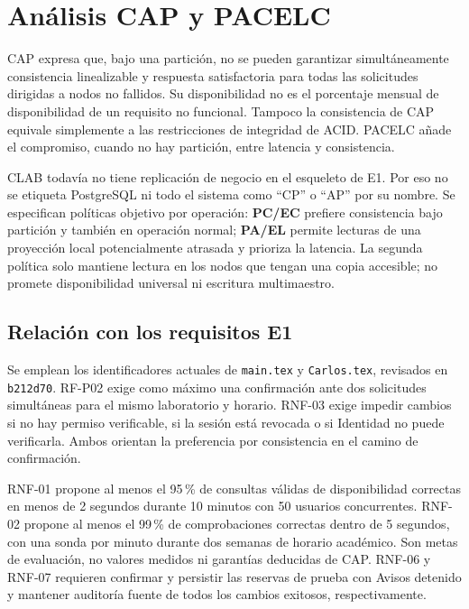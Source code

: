 \section{Análisis CAP y PACELC}
\label{sec:clab-cap}
\label{sec:clab-cap-pacelc}

CAP expresa que, bajo una partición, no se pueden garantizar simultáneamente
consistencia linealizable y respuesta satisfactoria para todas las solicitudes
dirigidas a nodos no fallidos\cite{clabGilbertLynchCAP}. Su disponibilidad no es
el porcentaje mensual de disponibilidad de un requisito no funcional. Tampoco
la consistencia de CAP equivale simplemente a las restricciones de integridad
de ACID. PACELC añade el compromiso, cuando no hay partición, entre latencia y
consistencia\cite{clabAbadiPACELC2012,clabAbadiPACELC}.

CLAB todavía no tiene replicación de negocio en el esqueleto de E1. Por eso no
se etiqueta PostgreSQL ni todo el sistema como ``CP'' o ``AP'' por su nombre.
Se especifican políticas objetivo por operación: \textbf{PC/EC} prefiere
consistencia bajo partición y también en operación normal; \textbf{PA/EL} permite
lecturas de una proyección local potencialmente atrasada y prioriza la latencia.
La segunda política solo mantiene lectura en los nodos que tengan una copia
accesible; no promete disponibilidad universal ni escritura multimaestro.

\subsection{Relación con los requisitos E1}

Se emplean los identificadores actuales de \texttt{main.tex} y
\texttt{Carlos.tex}, revisados en \texttt{b212d70}. RF-P02 exige como máximo
una confirmación ante dos solicitudes simultáneas para el mismo laboratorio
y horario. RNF-03 exige impedir cambios si no hay permiso verificable, si la
sesión está revocada o si Identidad no puede verificarla. Ambos orientan la
preferencia por consistencia en el camino de confirmación.

RNF-01 propone al menos el 95\,\% de consultas válidas de disponibilidad
correctas en menos de 2 segundos durante 10 minutos con 50 usuarios concurrentes.
RNF-02 propone al menos el 99\,\% de comprobaciones correctas dentro de 5 segundos,
con una sonda por minuto durante dos semanas de horario académico. Son metas
de evaluación, no valores medidos ni garantías deducidas de CAP. RNF-06 y
RNF-07 requieren confirmar y persistir las reservas de prueba con Avisos detenido
y mantener auditoría fuente de todos los cambios exitosos, respectivamente.

